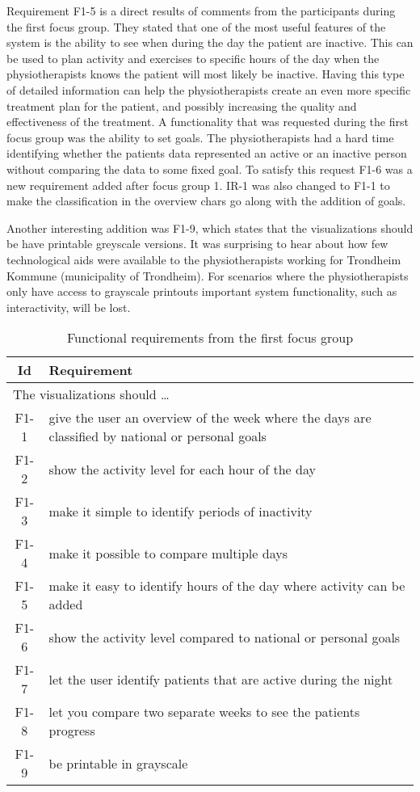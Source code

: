 Requirement F1-5 is a direct results of comments from the participants during the first focus group. They stated that one of the most useful features of the system is the ability to see when during the day the patient are inactive. This can be used to plan activity and exercises to specific hours of the day when the physiotherapists knows the patient will most likely be inactive. Having this type of detailed information can help the physiotherapists create an even more specific treatment plan for the patient, and possibly increasing the quality and effectiveness of the treatment. A functionality that was requested during the first focus group was the ability to set goals. The physiotherapists had a hard time identifying whether the patients data represented an active or an inactive person without comparing the data to some fixed goal. To satisfy this request F1-6 was a new requirement added after focus group 1. IR-1 was also changed to F1-1 to make the classification in the overview chars go along with the addition of goals. %

Another interesting addition was F1-9, which states that the visualizations should be have printable greyscale versions. It was surprising to hear about how few technological aids were available to the physiotherapists working for Trondheim Kommune (municipality of Trondheim). For scenarios where the physiotherapists only have access to grayscale printouts important system functionality, such as interactivity, will be lost.

\begin{table}[h!]
  \begin{center}
  \begin{tabular}{|c|p{12cm}|}
    \hline
      \textbf{Id} & \textbf{Requirement} \\ \hline
    \multicolumn{2}{|l|}{The visualizations should \ldots} \\ \hline
      F1-1 & give the user an overview of the week where the days are classified by national or personal goals \\ \hline
      F1-2 & show the activity level for each hour of the day \\ \hline
      F1-3 & make it simple to identify periods of inactivity \\ \hline
      F1-4 & make it possible to compare multiple days \\ \hline
      F1-5 & make it easy to identify hours of the day where activity can be added \\ \hline
      F1-6 & show the activity level compared to national or personal goals \\ \hline
      F1-7 & let the user identify patients that are active during the night \\ \hline
      F1-8 & let you compare two separate weeks to see the patients progress \\ \hline
      F1-9 & be printable in grayscale \\ \hline
  \end{tabular}
  \end{center}
  \caption{Functional requirements from the first focus group}
  \label{tab:f1Req}
\end{table}

